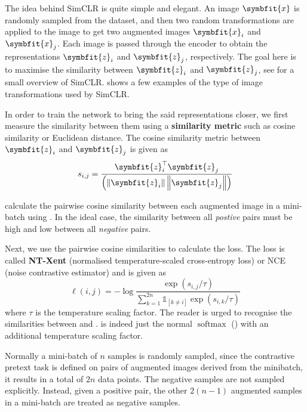 The idea behind SimCLR is quite simple and elegant. An image $\symbfit{x}$ is randomly sampled from the dataset, and then two random transformations are applied to the image to get two augmented images $\symbfit{x}_i$ and $\symbfit{x}_j$. Each image is passed through the encoder to obtain the representations $\symbfit{z}_i$ and $\symbfit{z}_j$, respectively. The goal here is to maximise the similarity between $\symbfit{z}_i$ and $\symbfit{z}_j$, see  for a small overview of SimCLR.  shows a few examples of the type of image transformations used by SimCLR.

In order to train the network to bring the said representations closer, we first measure the similarity between them using a \textbf{similarity metric} such as cosine similarity or Euclidean distance. The cosine similarity metric between $\symbfit{z}_i$ and $\symbfit{z}_j$ is given as
\begin{equation}
\label{eqn:simclr-cosine-sim}
s_{i, j}=\frac{\symbfit{z}_{i}^{\top} \symbfit{z}_{j}} {\left(\left\|\symbfit{z}_{i}\right\|\left\|\symbfit{z}_{j}\right\|\right)}
\end{equation}

 calculate the pairwise cosine similarity between each augmented image in a mini-batch using . In the ideal case, the similarity between all \textit{postive} pairs must be high and low between all \textit{negative} pairs.

Next, we use the pairwise cosine similarities to calculate the loss. The loss is called \textbf{NT-Xent} (normalised temperature-scaled cross-entropy loss) or NCE (noise contrastive estimator) and is given as
\begin{equation}
\ell(i, j)=-\log \frac{\exp \left(s_{i, j} / \tau\right)}{\sum_{k=1}^{2 n} \mathbb{1}_{[k \neq i]} \exp \left(s_{i, k} / \tau\right)}
\label{eqn:nt-xent}
\end{equation}
where $\tau$ is the temperature scaling factor. The reader is urged to recognise the similarities between  and .  is indeed just the normal $\operatorname{softmax}$ () with an additional temperature scaling factor.

Normally a mini-batch of $n$ samples is randomly sampled, since the contrastive pretext task is defined on pairs of augmented images derived from the minibatch, it results in a total of $2n$ data points. The negative samples are not sampled explicitly. Instead, given a positive pair, the other $2(n-1)$ augmented samples in a mini-batch are treated as negative samples.

